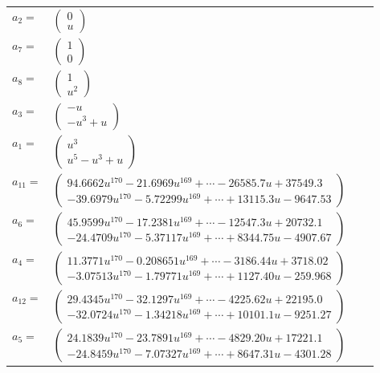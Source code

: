 \documentclass[1p]{elsarticle_modified}
\theoremstyle{definition}
\begin{document}
\begin{tabular}{m{7pt} m{180pt} m{7pt} m{180pt} }
\flushright $a_{2}=$&$\begin{pmatrix}0\\u\end{pmatrix}$ \\
\flushright $a_{7}=$&$\begin{pmatrix}1\\0\end{pmatrix}$ \\
\flushright $a_{8}=$&$\begin{pmatrix}1\\u^2\end{pmatrix}$ \\
\flushright $a_{3}=$&$\begin{pmatrix}- u\\- u^3+u\end{pmatrix}$ \\
\flushright $a_{1}=$&$\begin{pmatrix}u^3\\u^5- u^3+u\end{pmatrix}$ \\
\flushright $a_{11}=$&$\begin{pmatrix}94.6662 u^{170}-21.6969 u^{169}+\cdots-26585.7 u+37549.3\\-39.6979 u^{170}-5.72299 u^{169}+\cdots+13115.3 u-9647.53\end{pmatrix}$ \\
\flushright $a_{6}=$&$\begin{pmatrix}45.9599 u^{170}-17.2381 u^{169}+\cdots-12547.3 u+20732.1\\-24.4709 u^{170}-5.37117 u^{169}+\cdots+8344.75 u-4907.67\end{pmatrix}$ \\
\flushright $a_{4}=$&$\begin{pmatrix}11.3771 u^{170}-0.208651 u^{169}+\cdots-3186.44 u+3718.02\\-3.07513 u^{170}-1.79771 u^{169}+\cdots+1127.40 u-259.968\end{pmatrix}$ \\
\flushright $a_{12}=$&$\begin{pmatrix}29.4345 u^{170}-32.1297 u^{169}+\cdots-4225.62 u+22195.0\\-32.0724 u^{170}-1.34218 u^{169}+\cdots+10101.1 u-9251.27\end{pmatrix}$ \\
\flushright $a_{5}=$&$\begin{pmatrix}24.1839 u^{170}-23.7891 u^{169}+\cdots-4829.20 u+17221.1\\-24.8459 u^{170}-7.07327 u^{169}+\cdots+8647.31 u-4301.28\end{pmatrix}$ \\

\end{tabular}
\end{document}
